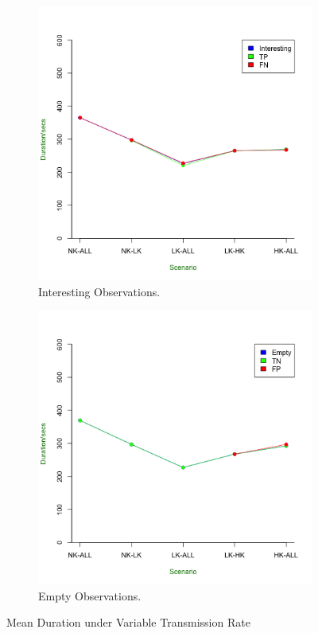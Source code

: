 \begin{figure}[h]
\centering
    \begin{subfigure}{.5\textwidth}
	\includegraphics[width=\textwidth]{Chap7/figures/real_int_dur}
	\caption{Interesting Observations.}
	\label{fig:real:int:dur}
	\end{subfigure}	

	\begin{subfigure}{.5\textwidth}
	\includegraphics[width=\textwidth]{Chap7/figures/real_empty_dur}
	\caption{Empty Observations.}
	\label{fig:real:empty:dur}
	\end{subfigure}	
\caption{Mean Duration under Variable Transmission Rate}
\end{figure}

